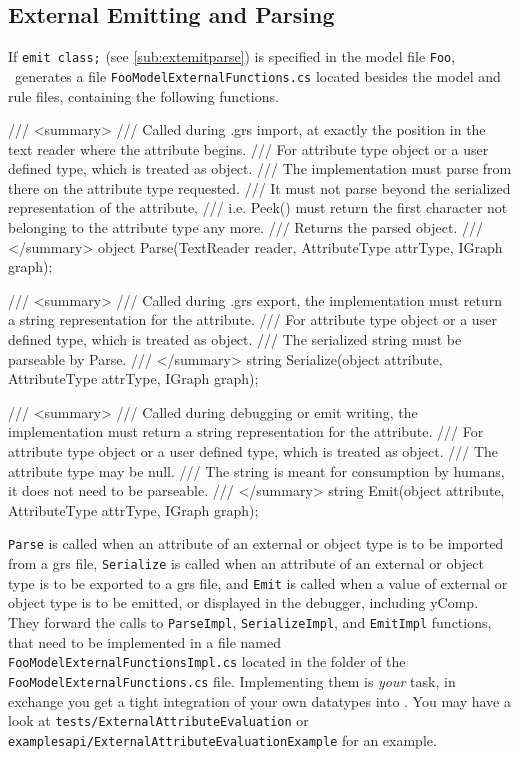 \subsection*{External Emitting and Parsing}\label{sub:apiextemitparse}
If \texttt{emit class;} (see \ref{sub:extemitparse}) is specified in the model file \texttt{Foo}, \GrG~generates a file \texttt{FooModelExternalFunctions.cs} located besides the model and rule files,
containing the following functions.

\begin{csharplet}
/// <summary>
/// Called during .grs import, at exactly the position in the text reader where the attribute begins.
/// For attribute type object or a user defined type, which is treated as object.
/// The implementation must parse from there on the attribute type requested.
/// It must not parse beyond the serialized representation of the attribute, 
/// i.e. Peek() must return the first character not belonging to the attribute type any more.
/// Returns the parsed object.
/// </summary>
object Parse(TextReader reader, AttributeType attrType, IGraph graph);

/// <summary>
/// Called during .grs export, the implementation must return a string representation for the attribute.
/// For attribute type object or a user defined type, which is treated as object.
/// The serialized string must be parseable by Parse.
/// </summary>
string Serialize(object attribute, AttributeType attrType, IGraph graph);

/// <summary>
/// Called during debugging or emit writing, the implementation must return a string representation for the attribute.
/// For attribute type object or a user defined type, which is treated as object.
/// The attribute type may be null.
/// The string is meant for consumption by humans, it does not need to be parseable.
/// </summary>
string Emit(object attribute, AttributeType attrType, IGraph graph);
\end{csharplet}

\texttt{Parse} is called when an attribute of an external or object type is to be imported from a grs file, \texttt{Serialize} is called when an attribute of an external or object type is to be exported to a grs file, and \texttt{Emit} is called when a value of external or object type is to be emitted, or displayed in the debugger, including yComp.
They forward the calls to \texttt{ParseImpl}, \texttt{SerializeImpl}, and \texttt{EmitImpl} functions, that need to be implemented in a file named \texttt{FooModelExternal\-FunctionsImpl.cs} located in the folder of the \texttt{FooModelExternalFunctions.cs} file.
Implementing them is \emph{your} task, in exchange you get a tight integration of your own datatypes into \GrG.
You may have a look at \texttt{tests/ExternalAttributeEvaluation} or  \texttt{examples\-api/ExternalAttributeEvaluationExample} for an example.

